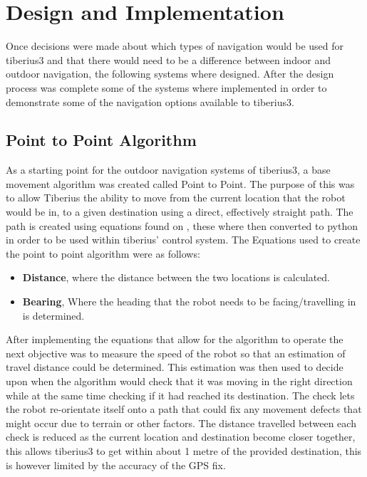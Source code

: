 \section{Design and Implementation}
Once decisions were made about which types of navigation would be used for \gls{tiberius3} and that there would need to be a difference between indoor and outdoor navigation, the following systems where designed. After the design process was complete some of the systems where implemented in order to demonstrate some of the navigation options available to \gls{tiberius3}. 
\subsection{Point to Point Algorithm}
\label{sec:nav_design_p2p} %
As a starting point for the outdoor navigation systems of \gls{tiberius3}, a base movement algorithm was created called Point to Point. The purpose of this was to allow Tiberius the ability to move from the current location that the robot would be in, to a given destination using a direct, effectively straight path. The path is created using equations found on \cite{lat-long-points}, these where then converted to python in order to be used within tiberius' control system. The Equations used to create the point to point algorithm were as follows:
\begin{itemize}
\item \textbf{Distance}, where the distance between the two locations is calculated.
\item \textbf{Bearing}, Where the heading that the robot needs to be facing/travelling in is determined.

\end{itemize}
After implementing the equations that allow for the algorithm to operate the next objective was to measure the speed of the robot so that an estimation of travel distance could be determined. This estimation was then used to decide upon when the algorithm would check that it was moving in the right direction while at the same time checking if it had reached its destination. The check lets the robot re-orientate itself onto a path that could fix any movement defects that might occur due to terrain or other factors. The distance travelled between each check is reduced as the current location and destination become closer together, this allows \gls{tiberius3} to get within about 1 metre of the provided destination, this is however limited by the accuracy of the \gls{GPS} fix.
